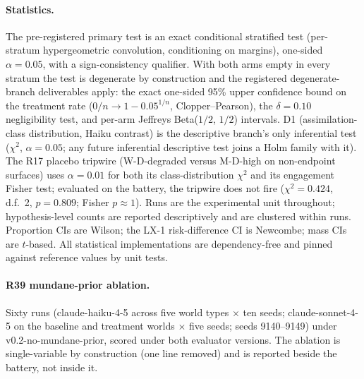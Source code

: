 \documentclass[11pt]{article}
\begin{document}
\paragraph{Statistics.} The pre-registered primary test is an exact conditional stratified test (per-stratum hypergeometric convolution, conditioning on margins), one-sided $\alpha = 0.05$, with a sign-consistency qualifier. With both arms empty in every stratum the test is degenerate by construction and the registered degenerate-branch deliverables apply: the exact one-sided 95\% upper confidence bound on the treatment rate ($0/n \rightarrow 1 - 0.05^{1/n}$, Clopper--Pearson\cite{clopper1934}), the $\delta = 0.10$ negligibility test, and per-arm Jeffreys Beta($1/2$, $1/2$) intervals\cite{jeffreys1946}. D1 (assimilation-class distribution, Haiku contrast) is the descriptive branch's only inferential test ($\chi^2$, $\alpha = 0.05$; any future inferential descriptive test joins a Holm family with it). The R17 placebo tripwire (W-D-degraded versus M-D-high on non-endpoint surfaces) uses $\alpha = 0.01$ for both its class-distribution $\chi^2$ and its engagement Fisher test; evaluated on the battery, the tripwire does not fire ($\chi^2 = 0.424$, d.f.\ 2, $p = 0.809$; Fisher $p \approx 1$). Runs are the experimental unit throughout; hypothesis-level counts are reported descriptively and are clustered within runs. Proportion CIs are Wilson\cite{wilson1927}; the LX-1 risk-difference CI is Newcombe\cite{newcombe1998}; mass CIs are $t$-based. All statistical implementations are dependency-free and pinned against reference values by unit tests.

\paragraph{R39 mundane-prior ablation.} Sixty runs (claude-haiku-4-5 across five world types $\times$ ten seeds; claude-sonnet-4-5 on the baseline and treatment worlds $\times$ five seeds; seeds 9140--9149) under v0.2-no-mundane-prior, scored under both evaluator versions. The ablation is single-variable by construction (one line removed) and is reported beside the battery, not inside it.
\end{document}
